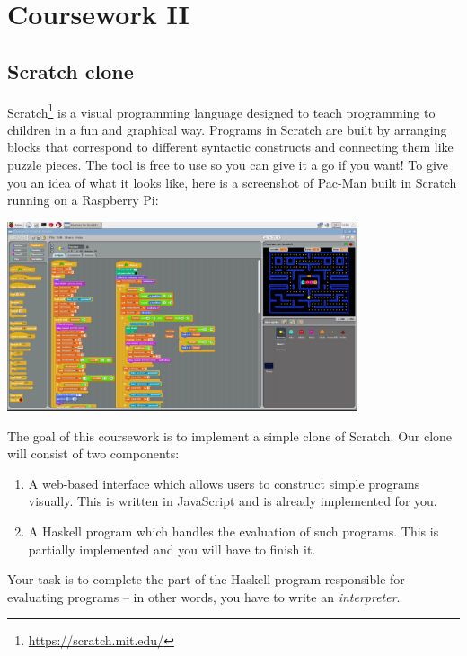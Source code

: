 
\newcommand{\deadlineTwoTime}{noon}
\newcommand{\deadlineTwoDate}{18 March 2020}
\newcommand{\submissionTwoURL}{https://tabula.warwick.ac.uk/coursework/submission/ac09b7de-5e75-45f9-87e9-ab847d96a001}
\newcommand{\classroomTwoURL}{https://classroom.github.com/a/aW9z1Yip}


\cleardoublepage
\chapter{Coursework II}

\section{Scratch clone}

Scratch\footnote{\url{https://scratch.mit.edu/}} is a visual programming language designed to teach programming to children in a fun and graphical way. Programs in Scratch are built by arranging blocks that correspond to different syntactic constructs and connecting them like puzzle pieces. The tool is free to use so you can give it a go if you want! To give you an idea of what it looks like, here is a screenshot of Pac-Man built in Scratch running on a Raspberry Pi:

\begin{center}
\includegraphics[width=390px]{cswk/scratch_rpi.png}
\end{center}

The goal of this coursework is to implement a simple clone of Scratch. Our clone will consist of two components:
\begin{enumerate}
    \item A web-based interface which allows users to construct simple programs visually. This is written in JavaScript and is already implemented for you.
    \item A Haskell program which handles the evaluation of such programs. This is partially implemented and you will have to finish it.
\end{enumerate}
Your task is to complete the part of the Haskell program responsible for evaluating programs -- in other words, you have to write an \emph{interpreter}.

